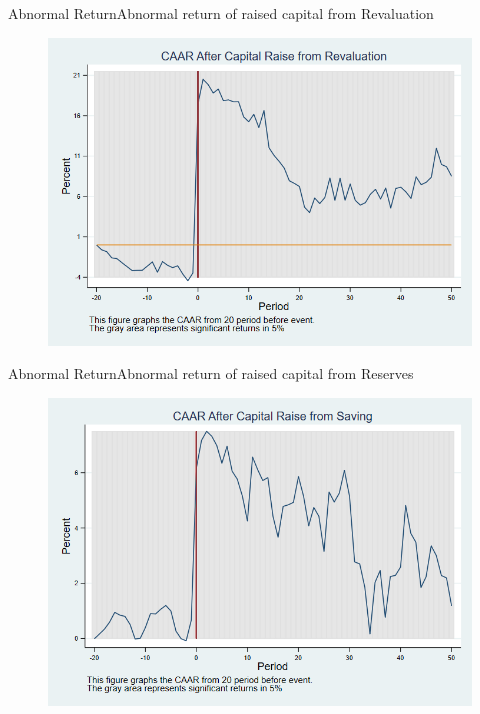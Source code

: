 \documentclass{beamer}
\begin{document}
\begin{frame}{Abnormal Return}{Abnormal return of raised capital from Revaluation}
	\label{car_marketmodel_industryRevaluation}
	\begin{figure}
		\centering
		\includegraphics[width=0.65\linewidth]{Output/car_marketmodel_industryRevaluation.png}
		\label{fig:car_marketmodel_industryRevaluation}
	\end{figure}
\end{frame}


\begin{frame}{Abnormal Return}{Abnormal return of raised capital from Reserves}
	\label{car_marketmodel_industrySaving}
	\begin{figure}
		\centering
		\includegraphics[width=0.65\linewidth]{Output/car_marketmodel_industrySaving.png}
		\label{fig:car_marketmodel_industrySaving}
	\end{figure}
\end{frame}
\end{document}
